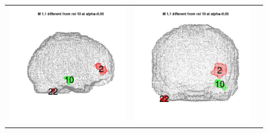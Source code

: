 \documentclass[12pt]{article}
\begin{document}
\begin{figure}[h]
\centering
\begin{tabular}{ccc}
\includegraphics[scale = 0.24]{../a7plots/d_1r_10_view1.png} & 
\includegraphics[scale = 0.24]{../a7plots/d_1r_10_view2.png} & 

\end{tabular}
\end{figure}
\end{document}
